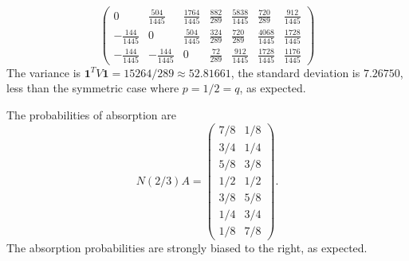 \documentclass[12pt]{article}
\begin{document}
\begin{example}
\[\begin{pmatrix}
0 & \frac{504}{1445} & \frac{1764}{1445} & \frac{882}{289} & \frac{5838}{1445} & \frac{720}{289} & \frac{912}{1445}\\
-\frac{144}{1445} & 0 & \frac{504}{1445} & \frac{324}{289} & \frac{720}{289} & \frac{4068}{1445} & \frac{1728}{1445}\\
-\frac{144}{1445} & -\frac{144}{1445} & 0 & \frac{72}{289} & \frac{912}{1445} & \frac{1728}{1445} & \frac{1176}{1445}\end{pmatrix}\]
    The variance is \( \mathbf{1}^{T} V \mathbf{1} = 15264/289
    \approx 52.81661 \), the standard deviation is \( 7.26750 \), less
    than the symmetric case where \( p =1/2 = q \), as expected.

    The probabilities of absorption are
    \[
        N(2/3) A =
        \begin{pmatrix}
            7/8 & 1/8\\
            3/4 & 1/4\\
            5/8 & 3/8\\
            1/2 & 1/2\\
            3/8 & 5/8\\
            1/4 & 3/4\\
            1/8 & 7/8
        \end{pmatrix}.
    \] The absorption probabilities are strongly biased to the right, as
    expected.
\end{example}
\end{document}
